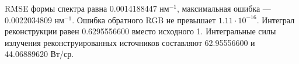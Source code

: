 RMSE формы спектра равна 0.0014188447 нм$^{-1}$, максимальная ошибка --- 0.0022034809 нм$^{-1}$. Ошибка обратного RGB не превышает $1.11\cdot10^{-16}$. Интеграл реконструкции равен 0.6295556600 вместо исходного 1. Интегральные силы излучения реконструированных источников составляют 62.95556600 и 44.06889620 Вт/ср.
